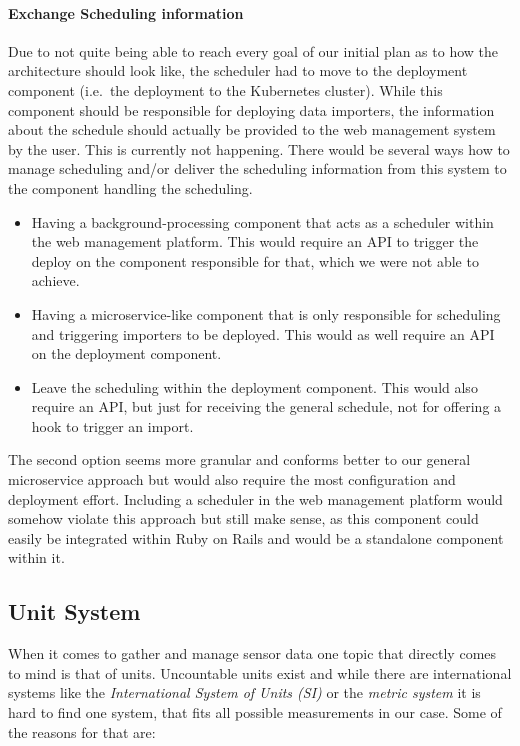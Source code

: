 \paragraph{Exchange Scheduling
information}\label{exchange-scheduling-information}

Due to not quite being able to reach every goal of our initial plan as
to how the architecture should look like, the scheduler had to move to
the deployment component (i.e.~the deployment to the Kubernetes
cluster). While this component should be responsible for deploying data
importers, the information about the schedule should actually be
provided to the web management system by the user. This is currently not
happening. There would be several ways how to manage scheduling and/or
deliver the scheduling information from this system to the component
handling the scheduling.

\begin{itemize}
\tightlist
\item
  Having a background-processing component that acts as a scheduler
  within the web management platform. This would require an API to
  trigger the deploy on the component responsible for that, which we
  were not able to achieve.
\item
  Having a microservice-like component that is only responsible for
  scheduling and triggering importers to be deployed. This would as well
  require an API on the deployment component.
\item
  Leave the scheduling within the deployment component. This would also
  require an API, but just for receiving the general schedule, not for
  offering a hook to trigger an import.
\end{itemize}

The second option seems more granular and conforms better to our general
microservice approach but would also require the most configuration and
deployment effort. Including a scheduler in the web management platform
would somehow violate this approach but still make sense, as this
component could easily be integrated within Ruby on Rails and would be a
standalone component within it.

\subsection{Unit System}\label{unit-system}

When it comes to gather and manage sensor data one topic that directly
comes to mind is that of units. Uncountable units exist and while there
are international systems like the \emph{International System of Units
(SI)} or the \emph{metric system} it is hard to find one system, that
fits all possible measurements in our case. Some of the reasons for that
are:

